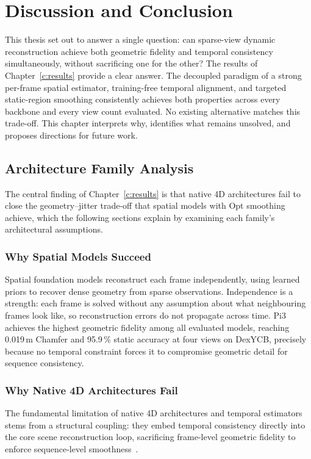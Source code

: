 \chapter{Discussion and Conclusion}
\label{c:discussion}

This thesis set out to answer a single question: can sparse-view dynamic reconstruction
achieve both geometric fidelity and temporal consistency simultaneously, without
sacrificing one for the other? The results of Chapter~\ref{c:results} provide a clear
answer. The decoupled paradigm of a strong per-frame spatial estimator, training-free
temporal alignment, and targeted static-region smoothing consistently achieves both
properties across every backbone and every view count evaluated. No existing alternative
matches this trade-off. This chapter interprets why, identifies what remains unsolved,
and proposes directions for future work.

\section{Architecture Family Analysis}
\label{sec:architecture_analysis}

The central finding of Chapter~\ref{c:results} is that native 4D architectures fail to
close the geometry--jitter trade-off that spatial models with Opt smoothing achieve,
which the following sections explain by examining each family's architectural assumptions.

\subsection{Why Spatial Models Succeed}
Spatial foundation models reconstruct each frame independently, using learned priors to
recover dense geometry from sparse observations. Independence is a strength: each frame
is solved without any assumption about what neighbouring frames look like, so
reconstruction errors do not propagate across time. Pi3 achieves the highest geometric fidelity among all evaluated models, reaching
0.019\,m Chamfer and 95.9\,\% static accuracy at four views on DexYCB, precisely
because no temporal constraint forces it to compromise geometric detail for sequence
consistency.

\subsection{Why Native 4D Architectures Fail}
The fundamental limitation of native 4D architectures and temporal estimators stems from a structural coupling: they embed temporal consistency directly into the core scene reconstruction loop, sacrificing frame-level geometric fidelity to enforce sequence-level smoothness~\cite{vggt4d, monofusion}. 

